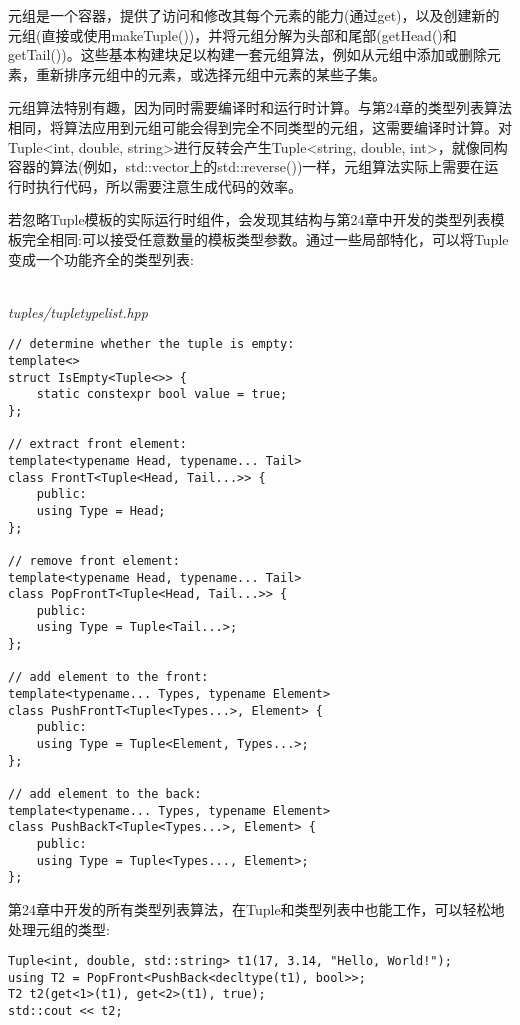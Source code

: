 
元组是一个容器，提供了访问和修改其每个元素的能力(通过get)，以及创建新的元组(直接或使用makeTuple())，并将元组分解为头部和尾部(getHead()和getTail())。这些基本构建块足以构建一套元组算法，例如从元组中添加或删除元素，重新排序元组中的元素，或选择元组中元素的某些子集。

元组算法特别有趣，因为同时需要编译时和运行时计算。与第24章的类型列表算法相同，将算法应用到元组可能会得到完全不同类型的元组，这需要编译时计算。对Tuple<int, double, string>进行反转会产生Tuple<string, double, int>，就像同构容器的算法(例如，std::vector上的std::reverse())一样，元组算法实际上需要在运行时执行代码，所以需要注意生成代码的效率。


若忽略Tuple模板的实际运行时组件，会发现其结构与第24章中开发的类型列表模板完全相同:可以接受任意数量的模板类型参数。通过一些局部特化，可以将Tuple变成一个功能齐全的类型列表:

\hspace*{\fill} \\ %
\noindent
\textit{tuples/tupletypelist.hpp}
\begin{lstlisting}[style=styleCXX]
// determine whether the tuple is empty:
template<>
struct IsEmpty<Tuple<>> {
	static constexpr bool value = true;
};

// extract front element:
template<typename Head, typename... Tail>
class FrontT<Tuple<Head, Tail...>> {
	public:
	using Type = Head;
};

// remove front element:
template<typename Head, typename... Tail>
class PopFrontT<Tuple<Head, Tail...>> {
	public:
	using Type = Tuple<Tail...>;
};

// add element to the front:
template<typename... Types, typename Element>
class PushFrontT<Tuple<Types...>, Element> {
	public:
	using Type = Tuple<Element, Types...>;
};

// add element to the back:
template<typename... Types, typename Element>
class PushBackT<Tuple<Types...>, Element> {
	public:
	using Type = Tuple<Types..., Element>;
};
\end{lstlisting}

第24章中开发的所有类型列表算法，在Tuple和类型列表中也能工作，可以轻松地处理元组的类型:

\begin{lstlisting}[style=styleCXX]
Tuple<int, double, std::string> t1(17, 3.14, "Hello, World!");
using T2 = PopFront<PushBack<decltype(t1), bool>>;
T2 t2(get<1>(t1), get<2>(t1), true);
std::cout << t2;
\end{lstlisting}

